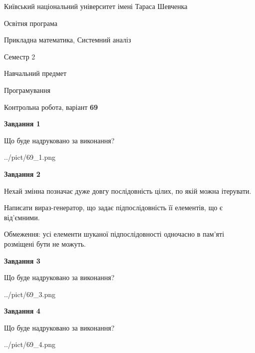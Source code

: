 \documentclass[12pt, ukrainian]{article}
\begin{document}
{{\begin {small}\par
{ \center  Київський національний університет імені Тараса Шевченка \par}
{\parbox {5 cm}{Освітня програма \hfill}{\parbox {8 cm}{Прикладна математика, Системний аналіз \hfill}}\parbox {5 cm}{\hfill Семестр 2}}\par
{\parbox {5 cm} {Навчальний предмет \hfill}\parbox {7 cm}{Програмування \hfill}\parbox {6cm}{\hfill}\par}\vspace{-7pt} \end{small}}{\center Контрольна робота, варіант  \No \textbf
{ 69 }\par}}
{
\begin {large}
{\begin {center}\textbf{Завдання 1}\end {center}}\par
Що буде надруковано за виконання?\par\par
\begin{center}
	{../pict/69_1.png}
\end{center}
\newpage

{\begin {center}\textbf{Завдання 2}\end {center}}\par
Нехай змінна  позначає дуже довгу послідовність цілих, по якій можна ітерувати.

Написати вираз-генератор, що задає підпослідовність її елементів, що є від'єм\-ни\-ми.

Обмеження: усі елементи шуканої підпослідовності одночасно в пам'яті розміщені бути не можуть.\par
\newpage

{\begin {center}\textbf{Завдання 3}\end {center}}\par
Що буде надруковано за виконання?
\begin{center}
	{../pict/69_3.png}
\end{center}
\newpage

{\begin {center}\textbf{Завдання 4}\end {center}}\par
Що буде надруковано за виконання?\par
\begin{center}
	{../pict/69_4.png}
\end{center}
\newpage


\end{large}}
\end{document}
